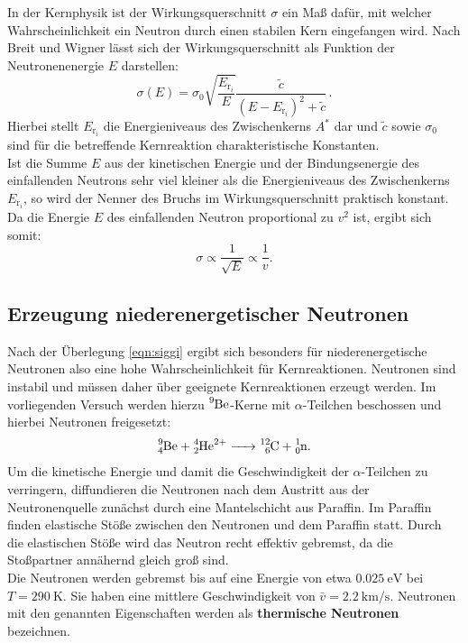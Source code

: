 In der Kernphysik ist der Wirkungsquerschnitt $\sigma$ ein Maß dafür, mit welcher Wahrscheinlichkeit ein Neutron durch einen stabilen Kern eingefangen wird.
Nach Breit und Wigner lässt sich der Wirkungsquerschnitt als Funktion der Neutronenenergie $E$ darstellen:
\begin{equation}
  \sigma (E)=\sigma _0 \sqrt{\frac{E_{\mathrm{r}_i}}{E}}\frac{\tilde{c}}{\left(E-E_{\mathrm{r}_i}\right)^2 +\tilde{c}} \, \text{.}
\end{equation}
Hierbei stellt $E_{\mathrm{r}_i}$ die Energieniveaus des Zwischenkerns $A^{*}$ dar und $\tilde{c}$ sowie $\sigma_0$ sind für die betreffende Kernreaktion charakteristische Konstanten.\\
Ist die Summe $E$ aus der kinetischen Energie und der Bindungsenergie des einfallenden Neutrons sehr viel kleiner als die Energieniveaus des Zwischenkerns $E_{\mathrm{r}_i}$, so wird der Nenner des Bruchs im Wirkungsquerschnitt praktisch konstant. Da die Energie $E$ des einfallenden Neutron proportional zu $v^2$ ist, ergibt sich somit:
\begin{equation}
  \label{eqn:siggi}
  \sigma \propto \frac{1}{\sqrt{E}}\propto \frac{1}{v} \text{.}
\end{equation}

\subsection{Erzeugung niederenergetischer Neutronen}
Nach der Überlegung \ref{eqn:siggi} ergibt sich besonders für niederenergetische Neutronen also eine hohe Wahrscheinlichkeit für Kernreaktionen.
Neutronen sind instabil und müssen daher über geeignete Kernreaktionen erzeugt werden.
Im vorliegenden Versuch werden hierzu $\ce{^{9}Be}$-Kerne mit $\alpha$-Teilchen beschossen und hierbei Neutronen freigesetzt:
\begin{align}
    \ce{ ^{9}_4Be + ^{4}_2He^{2+}  -> ^{12}_6C + ^{1}_0n}\text{.}
\end{align}
Um die kinetische Energie und damit die Geschwindigkeit der $\alpha$-Teilchen zu verringern, diffundieren die Neutronen nach dem Austritt aus der Neutronenquelle zunächst durch eine Mantelschicht aus Paraffin. Im Paraffin finden elastische Stöße zwischen den Neutronen und dem Paraffin statt. Durch die elastischen Stöße wird das Neutron recht effektiv gebremst, da die Stoßpartner annähernd gleich groß sind.\\
Die Neutronen werden gebremst bis auf eine Energie von etwa $\SI{0.025}{\electronvolt}$ bei $T=\SI{290}{\kelvin}$. Sie haben eine mittlere Geschwindigkeit von $\bar{v}=\SI{2.2}{\kilo\meter\per\second}$. Neutronen mit den genannten Eigenschaften werden als \textbf{thermische Neutronen} bezeichnen.

